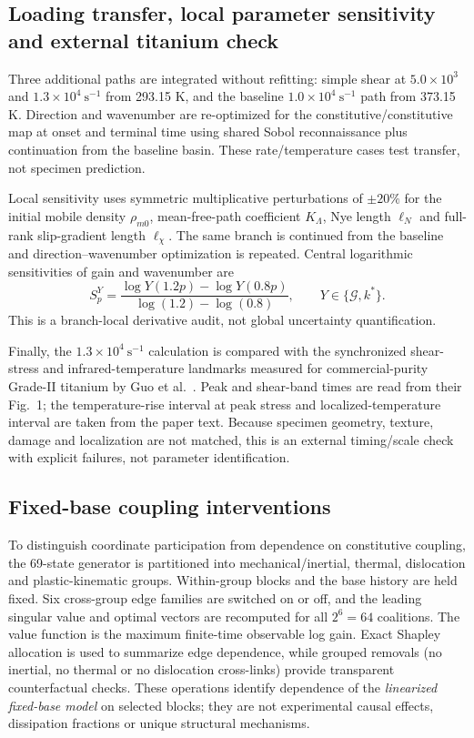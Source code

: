 \subsection{Loading transfer, local parameter sensitivity and external titanium check}

Three additional paths are integrated without refitting: simple shear at
$5.0\times10^3$ and $1.3\times10^4~\mathrm{s^{-1}}$ from 293.15 K, and the
baseline $1.0\times10^4~\mathrm{s^{-1}}$ path from 373.15 K. Direction and wavenumber are
re-optimized for the constitutive/constitutive map at onset and terminal time
using shared Sobol reconnaissance plus continuation from the baseline basin.
These rate/temperature cases test transfer, not specimen prediction.

Local sensitivity uses symmetric multiplicative perturbations of $\pm20\%$
for the initial mobile density $\rho_{m0}$, mean-free-path coefficient
$K_\Lambda$, Nye length $\ell_N$ and full-rank slip-gradient length
$\ell_\chi$.  The same branch is continued from the baseline and
direction--wavenumber optimization is repeated.  Central logarithmic
sensitivities of gain and wavenumber are
\begin{equation}
 S_p^Y=\frac{\log Y(1.2p)-\log Y(0.8p)}
 {\log(1.2)-\log(0.8)},
 \qquad Y\in\{\mathcal G,k^*\}.
 \label{eq:ft_local_log_sensitivity}
\end{equation}
This is a branch-local derivative audit, not global uncertainty
quantification.

Finally, the $1.3\times10^4~\mathrm{s^{-1}}$ calculation is compared with the
synchronized shear-stress and infrared-temperature landmarks measured for
commercial-purity Grade-II titanium by Guo et al.\ \cite{GuoEtAl2019PRL}.
Peak and shear-band times are read from their Fig.~1; the temperature-rise
interval at peak stress and localized-temperature interval are taken from the
paper text.  Because specimen geometry, texture, damage and localization are
not matched, this is an external timing/scale check with explicit failures,
not parameter identification.

\subsection{Fixed-base coupling interventions}

To distinguish coordinate participation from dependence on constitutive coupling, the 69-state generator is partitioned into mechanical/inertial, thermal, dislocation and plastic-kinematic groups. Within-group blocks and the base history are held fixed. Six cross-group edge families are switched on or off, and the leading singular value and optimal vectors are recomputed for all $2^6=64$ coalitions. The value function is the maximum finite-time observable log gain. Exact Shapley allocation is used to summarize edge dependence, while grouped removals (no inertial, no thermal or no dislocation cross-links) provide transparent counterfactual checks. These operations identify dependence of the \emph{linearized fixed-base model} on selected blocks; they are not experimental causal effects, dissipation fractions or unique structural mechanisms.

